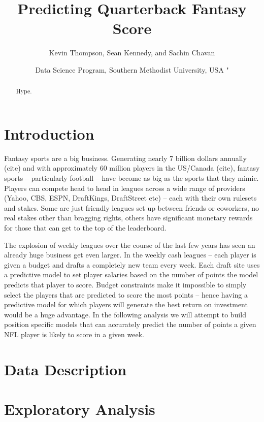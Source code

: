 \documentclass[american,]{article}
\title{Predicting Quarterback Fantasy Score}
\author{Kevin Thompson, Sean Kennedy, and Sachin Chavan}
\date{Data Science Program, Southern Methodist University, USA \break"}
\begin{document}
\maketitle
\begin{abstract}
Hype.
\end{abstract}

\section{Introduction}\label{introduction}

Fantasy sports are a big business. Generating nearly 7 billion dollars
annually (cite) and with approximately 60 million players in the
US/Canada (cite), fantasy sports -- particularly football -- have become
as big as the sports that they mimic. Players can compete head to head
in leagues across a wide range of providers (Yahoo, CBS, ESPN,
DraftKings, DraftStreet etc) -- each with their own rulesets and stakes.
Some are just friendly leagues set up between friends or coworkers, no
real stakes other than bragging rights, others have significant monetary
rewards for those that can get to the top of the leaderboard.

The explosion of weekly leagues over the course of the last few years
has seen an already huge business get even larger. In the weekly cash
leagues -- each player is given a budget and drafts a completely new
team every week. Each draft site uses a predictive model to set player
salaries based on the number of points the model predicts that player to
score. Budget constraints make it impossible to simply select the
players that are predicted to score the most points -- hence having a
predictive model for which players will generate the best return on
investment would be a huge advantage. In the following analysis we will
attempt to build position specific models that can accurately predict
the number of points a given NFL player is likely to score in a given
week.

\section{Data Description}\label{data-description}

\section{Exploratory Analysis}\label{exploratory-analysis}
\end{document}
